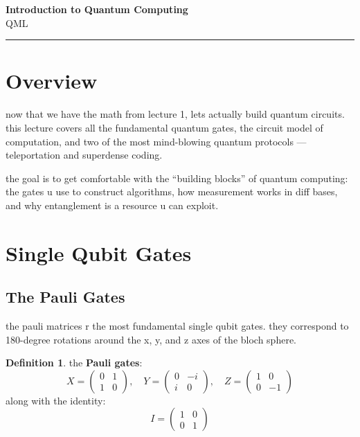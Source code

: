 \documentclass[11pt,a4paper]{article}
\theoremstyle{definition}
\newtheorem{definition}{Definition}[section]
\theoremstyle{remark}
\begin{document}
\begin{center}
    {\LARGE \textbf{Introduction to Quantum Computing}}\\[8pt]
    {\large QML}\\[12pt]
    \hrule
\end{center}

\vspace{12pt}
\tableofcontents
\newpage

\section{Overview}

now that we have the math from lecture 1, lets actually build quantum circuits. this lecture covers all the fundamental quantum gates, the circuit model of computation, and two of the most mind-blowing quantum protocols --- teleportation and superdense coding.

the goal is to get comfortable with the ``building blocks'' of quantum computing: the gates u use to construct algorithms, how measurement works in diff bases, and why entanglement is a resource u can exploit.

\section{Single Qubit Gates}

\subsection{The Pauli Gates}

the pauli matrices r the most fundamental single qubit gates. they correspond to 180-degree rotations around the x, y, and z axes of the bloch sphere.

\begin{definition}
the \textbf{Pauli gates}:
\[
X = \begin{pmatrix} 0 & 1 \\ 1 & 0 \end{pmatrix}, \quad
Y = \begin{pmatrix} 0 & -i \\ i & 0 \end{pmatrix}, \quad
Z = \begin{pmatrix} 1 & 0 \\ 0 & -1 \end{pmatrix}
\]
along with the identity:
\[
I = \begin{pmatrix} 1 & 0 \\ 0 & 1 \end{pmatrix}
\]
\end{definition}
\end{document}
